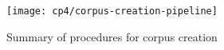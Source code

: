 \begin{figure}
    \centering
    \texttt{[image: cp4/corpus-creation-pipeline]}
    \caption{Summary of procedures for corpus creation}
    \label{fig:corpus-creation-pipeline}
\end{figure}

\clearpage
















